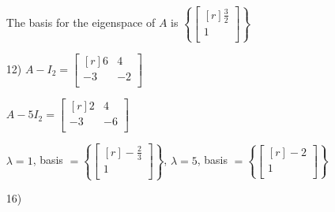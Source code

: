 \documentclass{article}
\begin{document}
\begin{enumerate}
    The basis for the eigenspace of $A$ is 
    $\left\{\begin{bmatrix*}[r]
        \frac{3}{2} \\
        1\\
    \end{bmatrix*}\right\}$

  \item[12)]
    $A - I_2 = 
    \begin{bmatrix*}[r]
      6 & 4 \\
      -3 & -2 \\
    \end{bmatrix*}$ 

    $A - 5I_2 = 
    \begin{bmatrix*}[r]
      2 & 4 \\
      -3 & -6 \\
    \end{bmatrix*}$

    $\lambda = 1$, basis $= \left\{
      \begin{bmatrix*}[r]
        -\frac{2}{3} \\
        1 \\
      \end{bmatrix*}
    \right\}$, $\lambda = 5$, basis $=\left\{
      \begin{bmatrix*}[r]
        -2 \\ 
        1 \\
      \end{bmatrix*}
    \right\}$

  \item[16)]

\end{enumerate}
\end{document}
